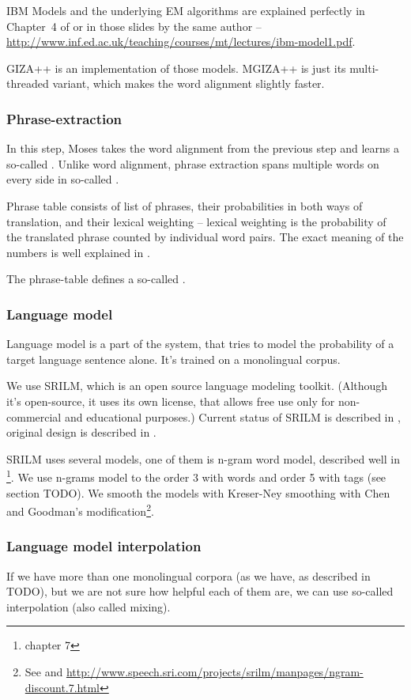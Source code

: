 IBM Models and the underlying EM algorithms are explained perfectly in Chapter~4 of \cite{koehn2010statistical} or in those slides by the same author -- \url{http://www.inf.ed.ac.uk/teaching/courses/mt/lectures/ibm-model1.pdf}.

GIZA++ is an implementation of those models. MGIZA++ is just its mu\-lti-thre\-aded variant, which makes the word alignment slightly faster.

\subsubsection{Phrase-extraction}
In this step, Moses takes the word alignment from the previous step and learns a so-called .
Unlike word alignment, phrase extraction spans multiple words on every side in so-called .

Phrase table consists of list of phrases, their probabilities in both ways of translation, and their lexical weighting -- lexical weighting is the probability of the translated phrase counted by individual word pairs. The exact meaning of the numbers is well explained in \cite{koehn2003}.

The phrase-table defines a so-called . 

\subsubsection{Language model}
Language model is a part of the system, that tries to model the probability of a target language sentence alone. It's trained on a monolingual corpus.

We use SRILM, which is an open source language modeling toolkit. (Although it's open-source, it uses its own license, that allows free use only for non-commercial and educational purposes.) Current status of SRILM is described in \cite{srilm}, original design is described in \cite{srilm_old}. 

SRILM uses several models, one of them is n-gram word model, described well in \cite{koehn2010statistical}\footnote{chapter 7}. We use n-grams model to the order 3 with words and order 5 with tags (see section TODO). We smooth the models with Kreser-Ney smoothing with Chen and Goodman's modification\footnote{See \cite{chen} and \url{http://www.speech.sri.com/projects/srilm/manpages/ngram-discount.7.html}}. 


\subsubsection{Language model interpolation}
\label{interpol}
If we have more than one monolingual corpora (as we have, as described in TODO), but we are not sure how helpful each of them are, we can use so-called 
interpolation (also called mixing).

